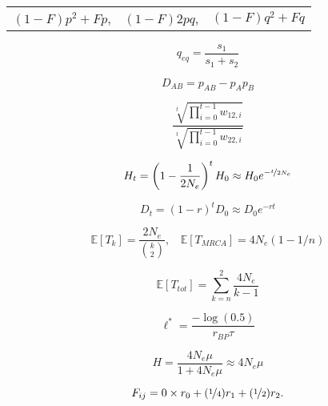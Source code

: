\documentclass[12pt,twocolumn]{article}
\newcommand{\E}{\mathbb{E}}
\begin{document}

\begin{center}
\begin{tabular}{ccc}
$(1-F) p^2 + F p$, & $(1-F) 2pq$, & $(1-F) q^2 + F q$ \nonumber
\end{tabular}
\end{center}

\begin{equation}
q_{eq} = \frac{s_1}{s_1+s_2} \nonumber
\end{equation}

\begin{equation}
D_{AB} = p_{AB} - p_Ap_B \nonumber
\end{equation}

\begin{equation}
	\frac{\sqrt[t]{\prod_{i=0}^{t-1}w_{12,i}}}{\sqrt[t]{\prod_{i=0}^{t-1}w_{22,i}}} \nonumber
\end{equation}

\begin{equation}
  H_t = \left(1-\frac{1}{2N_e} \right)^tH_0 \approx H_0 e^{-\nicefrac{t}{2N_e}} \nonumber
\end{equation}

\begin{equation}
  D_t=  (1-r)^t D_0 \approx D_0 e^{-rt} \nonumber
\end{equation}

\begin{equation}
\E[T_k] = \frac{2 N_e}{ {k \choose 2} },~~~~\E[T_{MRCA}] =
4N_e(1-1/n) \nonumber
\end{equation}

\begin{equation}
\E[T_{tot}] = \sum_{k=n}^2 \frac{4N_e}{k-1}  \nonumber
\end{equation}

\begin{equation}
\ell^* = \frac{-\log(0.5)}{r_{BP} \tau }  \nonumber
\end{equation}

\begin{equation}
  H = \frac{4N_e\mu}{1+4N_e\mu} \approx 4N_e\mu  \nonumber
\end{equation}

\begin{equation}
  F_{ij}= 0 \times r_0 + (\nicefrac{1}{4}) r_1  + (\nicefrac{1}{2}) r_2.  \nonumber
\label{eqn:coeffkinship}
\end{equation}
\end{document}
